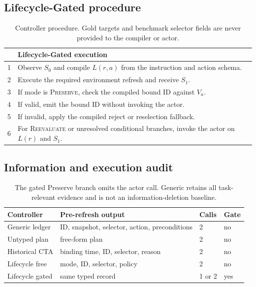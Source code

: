 \documentclass[10pt]{article}
\begin{document}
\subsection{Lifecycle-Gated procedure}
\begin{table}[h]
\centering
\small
\setlength{\tabcolsep}{4pt}
\begin{tabular}{rp{}}
\toprule
& Lifecycle-Gated execution \\
\midrule
1 & Observe $S_0$ and compile $L(r,a)$ from the instruction and action schema. \\
2 & Execute the required environment refresh and receive $S_1$. \\
3 & If mode is \textsc{Preserve}, check the compiled bound ID against $V_a$. \\
4 & If valid, emit the bound ID without invoking the actor. \\
5 & If invalid, apply the compiled reject or reselection fallback. \\
6 & For \textsc{Reevaluate} or unresolved conditional branches, invoke the actor on $L(r)$ and $S_1$. \\
\bottomrule
\end{tabular}
\caption{Controller procedure. Gold targets and benchmark selector fields are never provided to
the compiler or actor.}
\label{tab:supp-procedure}
\end{table}

\subsection{Information and execution audit}
\begin{table}[h]
\centering
\small
\begin{tabular}{llll}
\toprule
Controller & Pre-refresh output & Calls & Gate\\
\midrule
Generic ledger & ID, snapshot, selector, action, preconditions & 2 & no\\
Untyped plan & free-form plan & 2 & no\\
Historical CTA & binding time, ID, selector, reason & 2 & no\\
Lifecycle free & mode, ID, selector, policy & 2 & no\\
Lifecycle gated & same typed record & 1 or 2 & yes\\
\bottomrule
\end{tabular}
\caption{The gated Preserve branch omits the actor call. Generic retains all task-relevant
evidence and is not an information-deletion baseline.}
\end{table}
\end{document}
